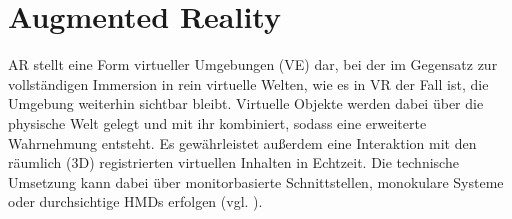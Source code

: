 

\section{Augmented Reality}
\ac{AR} stellt eine Form virtueller Umgebungen (\ac{VE}) dar, bei der im Gegensatz zur vollständigen Immersion in rein virtuelle Welten, wie es in \ac{VR} der Fall ist, die Umgebung weiterhin sichtbar bleibt. Virtuelle Objekte werden dabei über die physische Welt gelegt und mit ihr kombiniert, sodass eine erweiterte Wahrnehmung entsteht. Es gewährleistet außerdem eine Interaktion mit den räumlich (\ac{3D}) registrierten virtuellen Inhalten in Echtzeit. Die technische Umsetzung kann dabei über monitorbasierte Schnittstellen, monokulare Systeme oder durchsichtige \ac{HMD}s erfolgen (vgl. \cite{azuma_survey_1997}).

